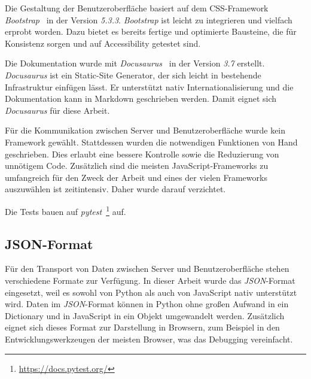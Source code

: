Die Gestaltung der Benutzeroberfläche basiert auf dem CSS-Framework \textit{Bootstrap}~\cite{bootstrap} in der Version \textit{5.3.3}.
\textit{Bootstrap} ist leicht zu integrieren und vielfach erprobt worden. Dazu bietet es bereits fertige und optimierte Bausteine, die für Konsistenz sorgen und auf Accessibility getestet sind.

Die Dokumentation wurde mit \textit{Docusaurus}~\cite{docusaurus} in der Version \textit{3.7} erstellt. \textit{Docusaurus} ist ein Static-Site Generator, der sich leicht in
bestehende Infrastruktur einfügen lässt. Er unterstützt nativ Internationalisierung und die Dokumentation kann in Markdown geschrieben werden. Damit eignet sich \textit{Docusaurus} für diese Arbeit.

Für die Kommunikation zwischen Server und Benutzeroberfläche wurde kein Framework gewählt. Stattdessen wurden die notwendigen Funktionen von Hand geschrieben. Dies erlaubt eine bessere Kontrolle sowie die
Reduzierung von unnötigem Code. Zusätzlich sind die meisten JavaScript-Frameworks zu umfangreich für den Zweck der Arbeit und eines der vielen Frameworks auszuwählen ist zeitintensiv. Daher wurde darauf verzichtet.

Die Tests bauen auf \textit{pytest}~\footnote{\hspace{1.5mm}\url{https://docs.pytest.org/}} auf.

\subsection{JSON-Format}

Für den Transport von Daten zwischen Server und Benutzeroberfläche stehen verschiedene Formate zur Verfügung. In dieser Arbeit wurde das \textit{JSON}-Format eingesetzt,
weil es sowohl von Python als auch von JavaScript nativ unterstützt wird. Daten im \textit{JSON}-Format können in Python ohne großen Aufwand in ein Dictionary und in JavaScript in ein Objekt umgewandelt werden.
Zusätzlich eignet sich dieses Format zur Darstellung in Browsern, zum Beispiel in den Entwicklungswerkzeugen der meisten Browser, was das Debugging vereinfacht.

